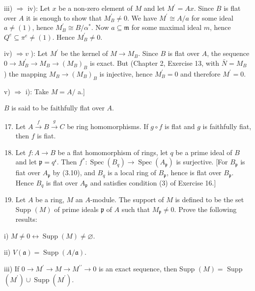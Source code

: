 \documentclass{standalone}
\theoremstyle{definition}
\theoremstyle{remark}
\begin{document}
iii) $\Rightarrow$ iv): Let $x$ be a non-zero element of $M$ and let $M^{\prime}=A x$. Since $B$ is flat over $A$ it is enough to show that $M_{B}^{\prime} \neq 0$. We have $M^{\prime} \cong A / a$ for some ideal $a \neq(1)$, hence $M_{B}^{\prime} \cong B / \alpha^{*}$. Now $a \subseteq \mathfrak{m}$ for some maximal ideal $m$, hence $Q^{e} \subseteq \pi^{e} \neq(1)$. Hence $M_{B}^{\prime} \neq 0$.

iv) $\Rightarrow v$ ): Let $M^{\prime}$ be the kernel of $M \rightarrow M_{B}$. Since $B$ is flat over $A$, the sequence $0 \rightarrow M_{B}^{\prime} \rightarrow M_{B} \rightarrow\left(M_{B}\right)_{B}$ is exact. But (Chapter 2, Exercise 13, with $\bar{N}=M_{B}$ ) the mapping $M_{B} \rightarrow\left(M_{B}\right)_{B}$ is injective, hence $M_{B}^{\prime}=0$ and therefore $M^{\prime}=0$.

v) $\Rightarrow$ i): Take $M=A /$ a.]

$B$ is said to be faithfully flat over $A$.

\begin{enumerate}
  \setcounter{enumi}{16}
  \item Let $A \stackrel{f}{\rightarrow} B \stackrel{g}{\rightarrow} C$ be ring homomorphisms. If $g \circ f$ is flat and $g$ is faithfully fiat, then $f$ is fiat.

  \item Let $f: A \rightarrow B$ be a flat homomorphism of rings, let $q$ be a prime ideal of $B$ and let $\mathfrak{p}=q^{\mathfrak{c}}$. Then $f^{*}: \operatorname{Spec}\left(B_{q}\right) \rightarrow \operatorname{Spec}\left(A_{\mathfrak{p}}\right)$ is surjective. [For $B_{\mathfrak{p}}$ is fiat over $A_{\mathfrak{p}}$ by (3.10), and $B_{q}$ is a local ring of $B_{\mathfrak{p}}$, hence is flat over $B_{\mathfrak{p}}$. Hence $B_{q}$ is flat over $A_{\mathfrak{p}}$ and satisfies condition (3) of Exercise 16.]

  \item Let $A$ be a ring, $M$ an $A$-module. The support of $M$ is defined to be the set Supp $(M)$ of prime ideals $\mathfrak{p}$ of $A$ such that $M_{\mathfrak{p}} \neq 0$. Prove the following results:

\end{enumerate}

i) $M \neq 0 \leftrightarrow \operatorname{Supp}(M) \neq \varnothing$.

ii) $V(\mathfrak{a})=\operatorname{Supp}(A / \mathfrak{a})$.

iii) If $0 \rightarrow M^{\prime} \rightarrow M \rightarrow M^{\prime \prime} \rightarrow 0$ is an exact sequence, then Supp $(M)=$ Supp $\left(M^{\prime}\right) \cup \operatorname{Supp}\left(M^{\prime}\right)$.
\end{document}
